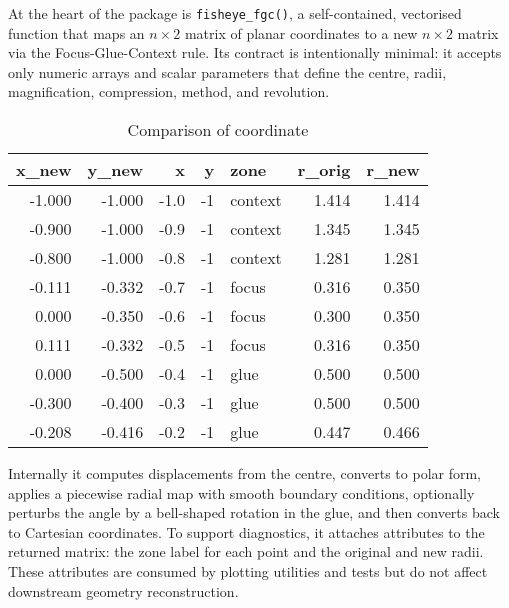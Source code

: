 At the heart of the package is \texttt{fisheye\_fgc()}, a self-contained, vectorised function that maps
an \(n\times 2\) matrix of planar coordinates to a new \(n\times 2\) matrix via the Focus-Glue-Context
rule. Its contract is intentionally minimal: it accepts only numeric arrays and scalar parameters
that define the centre, radii, magnification, compression, method, and revolution.

\begin{table}

\caption{\label{tab:unnamed-chunk-3}Comparison of coordinate}
\centering
\begin{tabular}[t]{r|r|r|r|l|r|r}
\hline
x\_new & y\_new & x & y & zone & r\_orig & r\_new\\
\hline
-1.000 & -1.000 & -1.0 & -1 & context & 1.414 & 1.414\\
\hline
-0.900 & -1.000 & -0.9 & -1 & context & 1.345 & 1.345\\
\hline
-0.800 & -1.000 & -0.8 & -1 & context & 1.281 & 1.281\\
\hline
-0.111 & -0.332 & -0.7 & -1 & focus & 0.316 & 0.350\\
\hline
0.000 & -0.350 & -0.6 & -1 & focus & 0.300 & 0.350\\
\hline
0.111 & -0.332 & -0.5 & -1 & focus & 0.316 & 0.350\\
\hline
0.000 & -0.500 & -0.4 & -1 & glue & 0.500 & 0.500\\
\hline
-0.300 & -0.400 & -0.3 & -1 & glue & 0.500 & 0.500\\
\hline
-0.208 & -0.416 & -0.2 & -1 & glue & 0.447 & 0.466\\
\hline
\end{tabular}
\end{table}

Internally it
computes displacements from the centre, converts to polar form, applies a piecewise radial map with
smooth boundary conditions, optionally perturbs the angle by a bell-shaped rotation in the glue, and
then converts back to Cartesian coordinates. To support diagnostics, it attaches attributes to the
returned matrix: the zone label for each point and the original and new radii. These attributes are
consumed by plotting utilities and tests but do not affect downstream geometry reconstruction.

